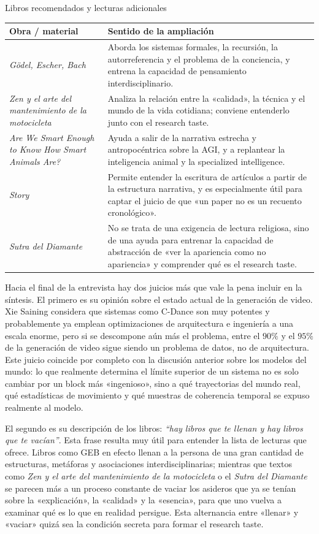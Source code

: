 \documentclass[a4paper,12pt]{article}
\begin{document}
\begin{knowledgebox}{Libros recomendados y lecturas adicionales}
\begin{tabularx}{\textwidth}{>{\raggedright\arraybackslash}p{} Y}
\toprule
Obra / material & Sentido de la ampliación \\
\midrule
\textit{Gödel, Escher, Bach} & Aborda los sistemas formales, la recursión, la autorreferencia y el problema de la conciencia, y entrena la capacidad de pensamiento interdisciplinario. \\
\textit{Zen y el arte del mantenimiento de la motocicleta} & Analiza la relación entre la «calidad», la técnica y el mundo de la vida cotidiana; conviene entenderlo junto con el research taste. \\
\textit{Are We Smart Enough to Know How Smart Animals Are?} & Ayuda a salir de la narrativa estrecha y antropocéntrica sobre la AGI, y a replantear la inteligencia animal y la specialized intelligence. \\
\textit{Story} & Permite entender la escritura de artículos a partir de la estructura narrativa, y es especialmente útil para captar el juicio de que «un paper no es un recuento cronológico». \\
\textit{Sutra del Diamante} & No se trata de una exigencia de lectura religiosa, sino de una ayuda para entrenar la capacidad de abstracción de «ver la apariencia como no apariencia» y comprender qué es el research taste. \\
\bottomrule
\end{tabularx}
\end{knowledgebox}

Hacia el final de la entrevista hay dos juicios más que vale la pena incluir en la síntesis. El primero es su opinión sobre el estado actual de la generación de video. Xie Saining considera que sistemas como C-Dance son muy potentes y probablemente ya emplean optimizaciones de arquitectura e ingeniería a una escala enorme, pero si se descompone aún más el problema, entre el \(90\%\) y el \(95\%\) de la generación de video sigue siendo un problema de datos, no de arquitectura. Este juicio coincide por completo con la discusión anterior sobre los modelos del mundo: lo que realmente determina el límite superior de un sistema no es solo cambiar por un block más «ingenioso», sino a qué trayectorias del mundo real, qué estadísticas de movimiento y qué muestras de coherencia temporal se expuso realmente al modelo.

El segundo es su descripción de los libros: \textit{``hay libros que te llenan y hay libros que te vacían''}. Esta frase resulta muy útil para entender la lista de lecturas que ofrece. Libros como GEB en efecto llenan a la persona de una gran cantidad de estructuras, metáforas y asociaciones interdisciplinarias; mientras que textos como \textit{Zen y el arte del mantenimiento de la motocicleta} o el \textit{Sutra del Diamante} se parecen más a un proceso constante de vaciar los asideros que ya se tenían sobre la «explicación», la «calidad» y la «esencia», para que uno vuelva a examinar qué es lo que en realidad persigue. Esta alternancia entre «llenar» y «vaciar» quizá sea la condición secreta para formar el research taste.
\end{document}
